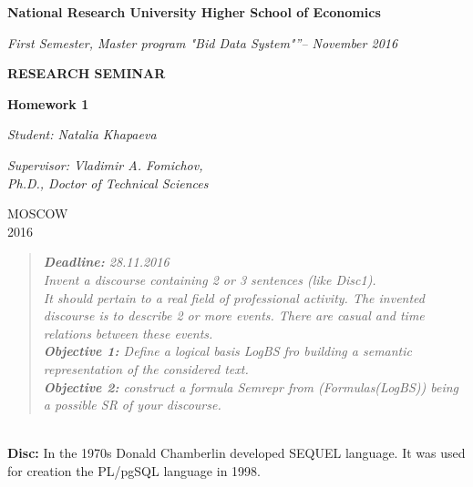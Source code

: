 \documentclass[a4paper,12pt,fleqn]{article}
\newcommand{\institution}{National Research University Higher School of Economics}
\newcommand{\titlehd}{RESEARCH SEMINAR}
\newcommand{\examtype}{First Semester, Master program "Bid Data System"”}
\newcommand{\examdate}{November 2016}
\newcommand{\examcode}{Homework 1}
\newcommand{\readtime}{Natalia Khapaeva}
\newcommand{\writetime}{Vladimir A. Fomichov,\\Ph.D., Doctor of Technical Sciences}
\begin{document}

\begin{center}
\large\textbf{\institution}
\end{center}
\vspace{1cm}

\begin{center}
\textit{ \examtype -- \examdate}
\end{center}
\vspace{1cm}

\begin{center}
\large\textbf{\titlehd}
\end{center}

\begin{center}
\large\textbf{\examcode}
\end{center}
\vspace{4cm}

\begin{center}
\textit{Student: \readtime}
\end{center}
\begin{center}
\textit{Supervisor:  \writetime}
\end{center}
\begin{center}
\vfill
MOSCOW\\
2016\\
\end{center}




\newpage
\begin{quote}
\textit{\textbf{Deadline:} 28.11.2016\\
Invent a discourse containing 2 or 3 sentences (like Disc1).\\
It should pertain to a real field of professional activity. The invented discourse is to describe 2 or more events. There are casual and time relations between these events.\\
\textbf{Objective 1:} Define a logical basis LogBS fro building a semantic representation of the considered text.\\
\textbf{Objective 2:} construct a formula Semrepr from (Formulas(LogBS)) being a possible SR of your discourse.}
\end{quote}
\\
\textbf{Disc:} In the 1970s Donald Chamberlin developed SEQUEL language. It was used for creation the PL/pgSQL language in 1998.\\
\end{document}
